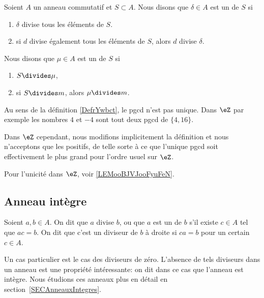 \begin{definition}\label{DefrYwbct}
    Soient \( A\) un anneau commutatif et \( S\subset A\). Nous disons que \( \delta\in A\) est un  de \( S\) si
    \begin{enumerate}
        \item
            \( \delta\) divise tous les éléments de \( S\).
        \item
            si \( d\) divise également tous les éléments de \( S\), alors \( d\) divise \( \delta\).
    \end{enumerate}
    Nous disons que \( \mu\in A\) est un  de \( S\) si
    \begin{enumerate}
        \item
            \( S\divides \mu\),
        \item
            si \( S\divides m\), alors \( \mu\divides m\).
    \end{enumerate}
\end{definition}

\begin{remark}
    Au sens de la définition \ref{DefrYwbct}, le pgcd n'est pas unique. Dans \( \eZ\) par exemple les nombres \( 4\) et \( -4\) sont tout deux pgcd de \( \{4,16  \}\).

    Dans \( \eZ\) cependant, nous modifions implicitement la définition et nous n'acceptons que les positifs, de telle sorte à ce que l'unique pgcd soit effectivement le plus grand pour l'ordre usuel sur \( \eZ\).

    Pour l'unicité dans \( \eZ\), voir \ref{LEMooBJVJooFyuFeN}.
\end{remark}

\subsection{Anneau intègre}

\begin{definition}\label{DiviseursAnneau}
	Soient \( a, b \in A \). On dit que $a$ divise $b$, ou que $a$ est un  de $b$ s'il existe \( c \in A \) tel que \( ac = b \). On dit que c'est un diviseur de $b$ à droite si \( ca = b \) pour un certain \( c \in A \).
\end{definition}
Un cas particulier est le cas des diviseurs de zéro. L'absence de tels diviseurs dans un anneau est une propriété intéressante: on dit dans ce cas que l'anneau est intègre. Nous étudions ces anneaux plus en détail en section~\ref{SECAnneauxIntegres}.

